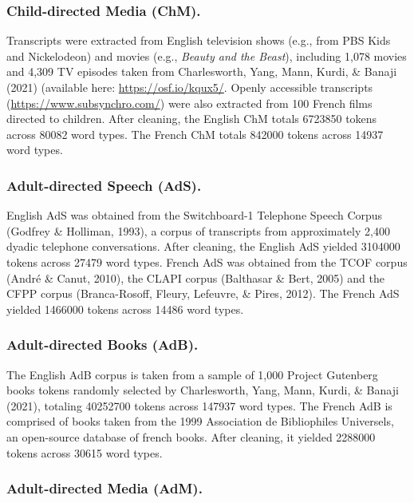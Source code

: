 \documentclass[10pt, letterpaper]{article}
\begin{document}
\hypertarget{child-directed-media-chm.}{%
\subsubsection{Child-directed Media
(ChM).}\label{child-directed-media-chm.}}

Transcripts were extracted from English television shows (e.g., from PBS
Kids and Nickelodeon) and movies (e.g., \emph{Beauty and the Beast}),
including 1,078 movies and 4,309 TV episodes taken from Charlesworth,
Yang, Mann, Kurdi, \& Banaji (2021) (available here:
\url{https://osf.io/kqux5/}. Openly accessible transcripts
(\url{https://www.subsynchro.com/}) were also extracted from 100 French
films directed to children. After cleaning, the English ChM totals
6723850 tokens across 80082 word types. The French ChM totals 842000
tokens across 14937 word types.

\hypertarget{adult-directed-speech-ads.}{%
\subsubsection{Adult-directed Speech
(AdS).}\label{adult-directed-speech-ads.}}

English AdS was obtained from the Switchboard-1 Telephone Speech Corpus
(Godfrey \& Holliman, 1993), a corpus of transcripts from approximately
2,400 dyadic telephone conversations. After cleaning, the English AdS
yielded 3104000 tokens across 27479 word types. French AdS was obtained
from the TCOF corpus (André \& Canut, 2010), the CLAPI corpus (Balthasar
\& Bert, 2005) and the CFPP corpus (Branca-Rosoff, Fleury, Lefeuvre, \&
Pires, 2012). The French AdS yielded 1466000 tokens across 14486 word
types.

\hypertarget{adult-directed-books-adb.}{%
\subsubsection{Adult-directed Books
(AdB).}\label{adult-directed-books-adb.}}

The English AdB corpus is taken from a sample of 1,000 Project Gutenberg
books tokens randomly selected by Charlesworth, Yang, Mann, Kurdi, \&
Banaji (2021), totaling 40252700 tokens across 147937 word types. The
French AdB is comprised of books taken from the 1999 Association de
Bibliophiles Universels, an open-source database of french books. After
cleaning, it yielded 2288000 tokens across 30615 word types.

\hypertarget{adult-directed-media-adm.}{%
\subsubsection{Adult-directed Media
(AdM).}\label{adult-directed-media-adm.}}
\end{document}
